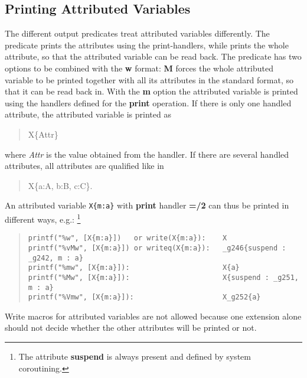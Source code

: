 \subsection{Printing Attributed Variables}
The different output predicates treat attributed variables differently.
The  predicate prints
the attributes using the print-handlers,
while  prints the whole attribute, so that the attributed variable
can be read back.
The  predicate has two options to be combined with
the {\bf w} format: {\bf M} forces the whole attributed variable to be printed
together with all its attributes in the standard format, so that
it can be read back in.
With the {\bf m} option the attributed variable is printed using the handlers
defined for the {\bf print} operation.
If there is only one handled attribute, the attributed variable is printed as
\begin{quote}
X\{Attr\}
\end{quote}
where {\it Attr} is the value obtained from the handler.
If there are several handled attributes, all attributes are qualified
like in
\begin{quote}
X\{a:A, b:B, c:C\}.
\end{quote}
{\samepage
An attributed variable {\tt X\{m:a\}} with {\bf print} handler {\bf =/2}
can thus be printed in different ways, e.g.:
\footnote{The attribute {\bf suspend} is always present and defined
by system coroutining.}
\begin{quote}\begin{verbatim}
printf("%w", [X{m:a}])   or write(X{m:a}):    X   
printf("%vMw", [X{m:a}]) or writeq(X{m:a}):   _g246{suspend : _g242, m : a}
printf("%mw", [X{m:a}]):                      X{a}
printf("%Mw", [X{m:a}]):                      X{suspend : _g251, m : a}
printf("%Vmw", [X{m:a}]):                     X_g252{a}
\end{verbatim}\end{quote}
}

Write macros for attributed variables are not allowed because one extension alone
should not decide whether the other attributes will be printed or not.

